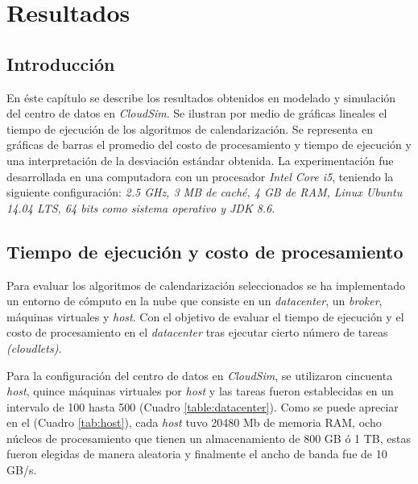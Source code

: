 \chead{}
\rhead{\thepage}


\chapter{Resultados}
\section*{Introducci\'on}

En éste capítulo se describe los resultados obtenidos en modelado y simulación del centro de datos en \textit{CloudSim}. 
Se ilustran por medio de gráficas lineales el tiempo de ejecución de los algoritmos de calendarización. Se representa en gráficas de barras el promedio del costo de procesamiento y tiempo de ejecución y una interpretación de la desviación estándar obtenida. La experimentación fue desarrollada en una computadora con un procesador \textit{Intel Core i5}, teniendo la siguiente configuración: \textit{2.5 GHz, 3 MB de cach\'e, 4 GB de RAM, Linux Ubuntu 14.04 LTS, 64 bits como sistema operativo y JDK 8.6}.






\vspace{20em} 

\section{Tiempo de ejecuci\'on y costo de procesamiento}


Para evaluar los algoritmos de calendarizaci\'on seleccionados se ha implementado un entorno de c\'omputo en la nube que consiste en un \textit{datacenter}, un \textit{broker}, m\'aquinas virtuales y \textit{host}.  Con el objetivo de evaluar el tiempo de ejecuci\'on y el costo de procesamiento en el \textit{datacenter} tras ejecutar cierto n\'umero de tareas \textit{(cloudlets)}.

Para la configuraci\'on del centro de datos en \textit{CloudSim}, se utilizaron cincuenta \textit{host}, quince m\'aquinas virtuales por \textit{host} y las tareas fueron establecidas en un intervalo de 100 hasta 500 (Cuadro \ref{table:datacenter}).
Como se puede apreciar en el (Cuadro \ref{tab:host}), cada \textit{host} tuvo 20480 Mb de memoria RAM, ocho n\'ucleos de procesamiento que tienen un almacenamiento de 800 GB \'o 1 TB, estas fueron elegidas de manera aleatoria y finalmente el ancho de banda fue de 10 GB/s.

